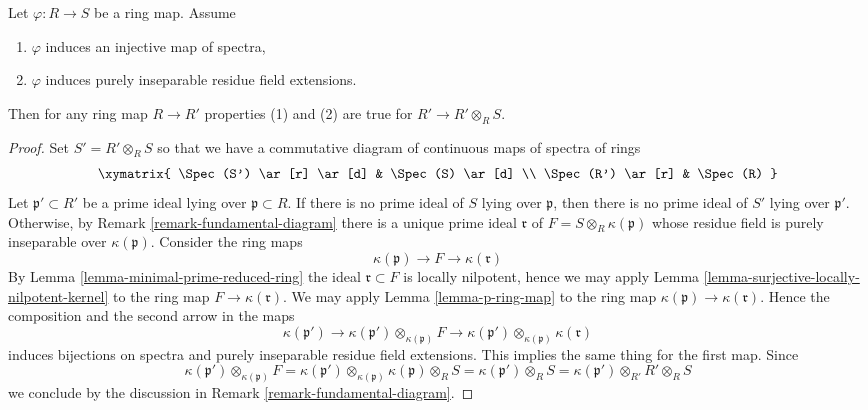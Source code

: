 \begin{lemma}
\label{lemma-radicial}
Let $\varphi : R \to S$ be a ring map. Assume
\begin{enumerate}
\item $\varphi$ induces an injective map of spectra,
\item $\varphi$ induces purely inseparable residue field extensions.
\end{enumerate}
Then for any ring map $R \to R'$ properties (1) and (2) are true for
$R' \to R' \otimes_R S$.
\end{lemma}

\begin{proof}
Set $S' = R' \otimes_R S$ so that we have a commutative diagram
of continuous maps of spectra of rings
$$
\xymatrix{
\Spec(S') \ar[r] \ar[d] & \Spec(S) \ar[d] \\
\Spec(R') \ar[r] & \Spec(R)
}
$$
Let $\mathfrak p' \subset R'$ be a prime ideal lying over
$\mathfrak p \subset R$. If there is no prime ideal of $S$
lying over $\mathfrak p$, then there is no prime ideal of
$S'$ lying over $\mathfrak p'$. Otherwise, by
Remark \ref{remark-fundamental-diagram} there is a unique
prime ideal $\mathfrak r$ of $F = S \otimes_R \kappa(\mathfrak p)$
whose residue field is purely inseparable over $\kappa(\mathfrak p)$.
Consider the ring maps
$$
\kappa(\mathfrak p) \to F \to \kappa(\mathfrak r)
$$
By Lemma \ref{lemma-minimal-prime-reduced-ring} the ideal
$\mathfrak r \subset F$ is locally nilpotent, hence
we may apply Lemma \ref{lemma-surjective-locally-nilpotent-kernel}
to the ring map $F \to \kappa(\mathfrak r)$.
We may apply Lemma \ref{lemma-p-ring-map}
to the ring map $\kappa(\mathfrak p) \to \kappa(\mathfrak r)$.
Hence the composition and the second arrow in the maps
$$
\kappa(\mathfrak p') \to
\kappa(\mathfrak p') \otimes_{\kappa(\mathfrak p)} F \to
\kappa(\mathfrak p') \otimes_{\kappa(\mathfrak p)} \kappa(\mathfrak r)
$$
induces bijections on spectra and purely inseparable residue
field extensions. This implies the same thing for the first
map. Since
$$
\kappa(\mathfrak p') \otimes_{\kappa(\mathfrak p)} F =
\kappa(\mathfrak p') \otimes_{\kappa(\mathfrak p)}
\kappa(\mathfrak p) \otimes_R S =
\kappa(\mathfrak p') \otimes_R S =
\kappa(\mathfrak p') \otimes_{R'} R' \otimes_R S
$$
we conclude by the discussion in Remark \ref{remark-fundamental-diagram}.
\end{proof}